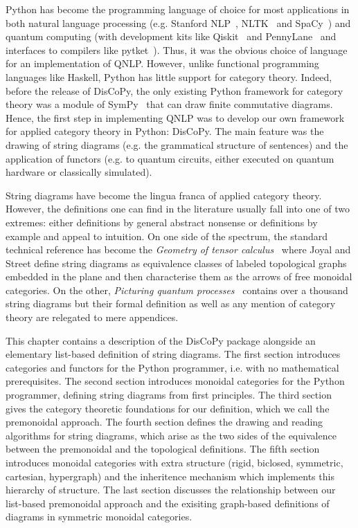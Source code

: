 
Python has become the programming language of choice for most applications in both natural language processing (e.g. Stanford NLP~\cite{ManningEtAl14}, NLTK~\cite{LoperBird02} and SpaCy~\cite{HonnibalMontani17}) and quantum computing (with development kits like Qiskit~\cite{Cross18} and PennyLane~\cite{BergholmEtAl20} and interfaces to compilers like pytket~\cite{SivarajahEtAl20}).
Thus, it was the obvious choice of language for an implementation of QNLP.
However, unlike functional programming languages like Haskell, Python has little support for category theory.
Indeed, before the release of DisCoPy, the only existing Python framework for category theory was a module of SymPy~\cite{MeurerEtAl17} that can draw finite commutative diagrams.
Hence, the first step in implementing QNLP was to develop our own framework for applied category theory in Python: DisCoPy.
The main feature was the drawing of string diagrams (e.g. the grammatical structure of sentences) and the application of functors (e.g. to quantum circuits, either executed on quantum hardware or classically simulated).

String diagrams have become the lingua franca of applied category theory.
However, the definitions one can find in the literature usually fall into one of two extremes: either definitions by general abstract nonsense or definitions by example and appeal to intuition.
On one side of the spectrum, the standard technical reference has become the \emph{Geometry of tensor calculus}~\cite{JoyalStreet91} where Joyal and Street define string diagrams as equivalence classes of labeled topological graphs embedded in the plane and then characterise them as the arrows of free monoidal categories.
On the other, \emph{Picturing quantum processes}~\cite{CoeckeKissinger17} contains over a thousand string diagrams but their formal definition as well as any mention of category theory are relegated to mere appendices.

This chapter contains a description of the DisCoPy package alongside an elementary list-based definition of string diagrams.
The first section introduces categories and functors for the Python programmer, i.e. with no mathematical prerequisites.
The second section introduces monoidal categories for the Python programmer, defining string diagrams from first principles.
The third section gives the category theoretic foundations for our definition, which we call the premonoidal approach.
The fourth section defines the drawing and reading algorithms for string diagrams, which arise as the two sides of the equivalence between the premonoidal and the topological definitions.
The fifth section introduces monoidal categories with extra structure (rigid, biclosed, symmetric, cartesian, hypergraph) and the inheritence mechanism which implements this hierarchy of structure.
The last section discusses the relationship between our list-based premonoidal approach and the exisiting graph-based definitions of diagrams in symmetric monoidal categories.
